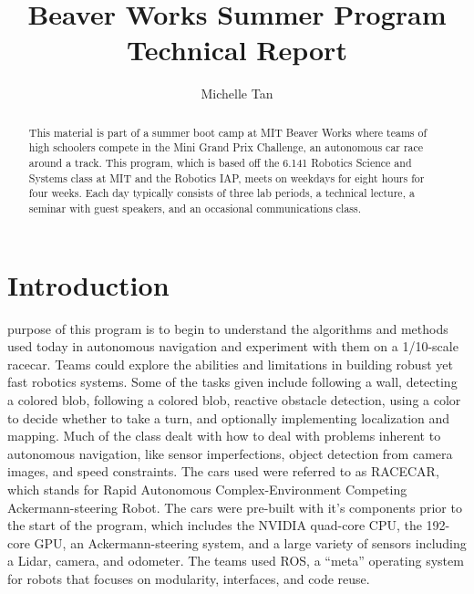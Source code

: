 \documentclass[journal, a4paper]{IEEEtran}
\begin{document}
    \title{Beaver Works Summer Program Technical Report}
    \author{Michelle Tan}
    \maketitle

\begin{abstract}
    This material is part of a summer boot camp at MIT Beaver Works where teams of high schoolers compete in the Mini Grand Prix Challenge, an autonomous car race around a track. This program, which is based off the 6.141 Robotics Science and Systems class at MIT and the Robotics IAP, meets on weekdays for eight hours for four weeks. Each day typically consists of three lab periods, a technical lecture, a seminar with guest speakers, and an occasional communications class. 
\end{abstract}
\section{Introduction}
     purpose of this program is to begin to understand the algorithms and methods used today in autonomous navigation and experiment with them on a 1/10-scale racecar. Teams could explore the abilities and limitations in building robust yet fast robotics systems. Some of the tasks given include following a wall, detecting a colored blob, following a colored blob, reactive obstacle detection, using a color to decide whether to take a turn, and optionally implementing localization and mapping. Much of the class dealt with how to deal with problems inherent to autonomous navigation, like sensor imperfections, object detection from camera images, and speed constraints. The cars used were referred to as RACECAR, which stands for Rapid Autonomous Complex-Environment Competing Ackermann-steering Robot. The cars were pre-built with it’s components prior to the start of the program, which includes the NVIDIA quad-core CPU, the 192-core GPU, an Ackermann-steering system, and a large variety of sensors including a Lidar, camera, and odometer. The teams used ROS, a “meta” operating system for robots that focuses on modularity, interfaces, and code reuse. \cite{plecture2} 
\end{document}
